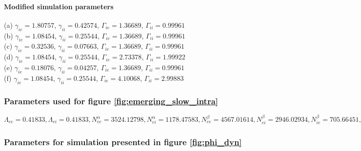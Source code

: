 \documentclass[a4paper,12pt]{article}
\begin{document}
\paragraph{Modified simulation parameters}
(a) $\gamma_{ie} = 1.80757$, $\gamma_{ii} = 0.42574$, $\Gamma_{ie} = 1.36689$, $\Gamma_{ii} = 0.99961$\\
(b) $\gamma_{ie} = 1.08454$, $\gamma_{ii} = 0.25544$, $\Gamma_{ie} = 1.36689$, $\Gamma_{ii} = 0.99961$\\
(c) $\gamma_{ie} = 0.32536$, $\gamma_{ii} = 0.07663$, $\Gamma_{ie} = 1.36689$, $\Gamma_{ii} = 0.99961$\\
(d) $\gamma_{ie} = 1.08454$, $\gamma_{ii} = 0.25544$, $\Gamma_{ie} = 2.73378$, $\Gamma_{ii} = 1.99922$\\
(e) $\gamma_{ie} = 0.18076$, $\gamma_{ii} = 0.04257$, $\Gamma_{ie} = 1.36689$, $\Gamma_{ii} = 0.99961$\\
(f) $\gamma_{ie} = 1.08454$, $\gamma_{ii} = 0.25544$, $\Gamma_{ie} = 4.10068$, $\Gamma_{ii} = 2.99883$\\

\subsubsection{Parameters used for figure \ref{fig:emerging_slow_intra}}
$\Lambda_{ee} = 0.41833, \Lambda_{ei} =  0.41833, N^{\alpha}_{ee} = 3524.12798, N^{\alpha}_{ei} = 1178.47583,
N^{\beta}_{ee} = 4567.01614, N^{\beta}_{ei} = 2946.02934, N^{\beta}_{ie} = 705.66451, N^{\beta}_{ii} = 155.69243,
\hat{\Gamma}_{ee} = 1.03021, \hat{\Gamma}_{ei} = 1.24548, \Gamma_{ie} = 3.32228, \Gamma_{ii} = 2.28976,
\chi_{ee} = 1290.08, \chi_{ei} = 1290.08, \gamma_{ee} = 0.71337, \gamma_{ei} = 0.53411,
\gamma_{ie} = 0.35526, \gamma_{ii} = 0.02911, h_e^{rest} = -79.27218, h_{ee}^{eq} = -19.32193,
h_{ei}^{eq} = -8.30757, h_i^{rest} = -76.08372, h_{ie}^{eq} = -85.45751, h_{ii}^{eq} = -84.48223,
\mu_e: -54.37736, \mu_i: -54.60727, p_{ee}: 6.83303, p_{ei}: 9.26794, p_{ie}: 0.0, p_{ii}: 0.0,
\phi_{ie}: 0, phi_{ii}: 0, S_e^{max} = 0.0637, S_i^{max} = 0.08382, \sigma_e = 4.16944,
\sigma_i = 2.1261, \tau_e = 73.3, \tau_i = 75.2, \tau^{slow}_{ee} = 1612.6,
  \tau^{slow}_{ei}: 1612.6, v_{ee} = 0.83906, v_{ei} = 0.83906$

\subsubsection{Parameters for simulation presented in figure \ref{fig:phi_dyn}}
\end{document}
